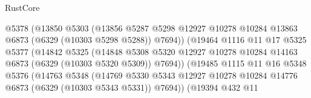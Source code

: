 \begin{lexlean}{RustCore}
\begin{coremodule}
                                      @5378
                                      (@13850
                                        @5303
                                        (@13856
                                          @5287
                                          @5298
                                          @12927
                                          @10278
                                          @10284
                                          @13863
                                          @6873
                                          (@6329 (@10303 @5298 @5288))
                                          @7694))
                                      (@19464
                                        @1116
                                        @11
                                        @17
                                        @5325
                                        @5377
                                        (@14842
                                          @5325
                                          (@14848
                                            @5308
                                            @5320
                                            @12927
                                            @10278
                                            @10284
                                            @14163
                                            @6873
                                            (@6329 (@10303 @5320 @5309))
                                            @7694))
                                        (@19485
                                          @1115
                                          @11
                                          @16
                                          @5348
                                          @5376
                                          (@14763
                                            @5348
                                            (@14769
                                              @5330
                                              @5343
                                              @12927
                                              @10278
                                              @10284
                                              @14776
                                              @6873
                                              (@6329 (@10303 @5343 @5331))
                                              @7694))
                                          (@19394
                                            @432
                                            @11

\end{coremodule}
\end{lexlean}

